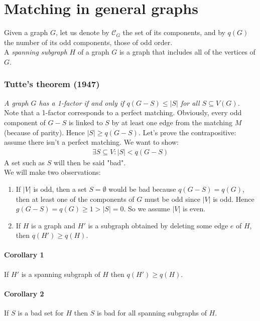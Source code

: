 	\section{Matching in general graphs}
		Given a graph $G$, let us denote by $\mathcal{C}_G$ the set of its components, and by $q(G)$ the number of its odd components, those of odd order.\\
		
		A \textit{spanning subgraph} $H$ of a graph $G$ is a graph that includes all of the vertices of $G$. 


		\subsubsection{Tutte's theorem (1947)} 
		
		\textit{A graph $G$ has a 1-factor if and only if $q(G - S) \leq |S|$ for all $S \subseteq V(G)$.}\\
		
		Note that a 1-factor corresponds to a perfect matching. Obviously, every odd component of $G - S$ is linked to $S$ by at least one edge from the matching $M$ (because of parity). Hence $|S| \geq q(G - S)$. Let's prove the contrapositive: assume there isn't a perfect matching. We want to show:
			\begin{eqnarray}
				\exists S \subseteq V : |S| < q(G - S)
			\end{eqnarray} 
			A set such as $S$ will then be said "bad".\\
		
		We will make two observations:
		\begin{enumerate}
			\item If $|V|$ is odd, then a set $S = \emptyset$ would be bad because $q(G - S) = q (G)$, then at least one of the components of $G$ must be odd since $|V|$ is odd. Hence $g(G -S) = q(G) \geq 1 > |S| = 0$. So we assume $|V|$ is even.
			\item If $H$ is a graph and $H'$ is a subgraph obtained by deleting some edge $e$ of $H$, then $q(H') \geq q(H)$.
		\end{enumerate}

		\paragraph{Corollary 1} If $H'$ is a spanning subgraph of $H$ then  $q(H') \geq q(H)$.
		
		\paragraph{Corollary 2} If $S$ is a bad set for $H$ then $S$ is bad for all spanning subgraphs of $H$.
		
